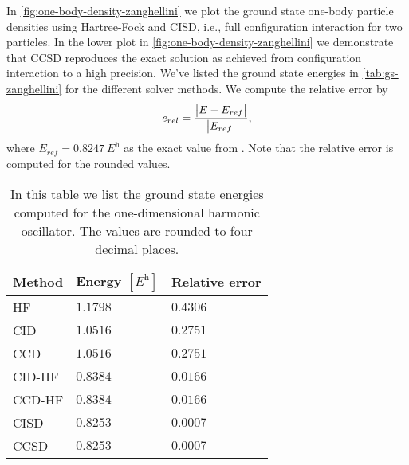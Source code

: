         In \autoref{fig:one-body-density-zanghellini} we plot the ground
        state one-body particle densities using Hartree-Fock and CISD, i.e.,
        full configuration interaction for two particles.
        In the lower plot in \autoref{fig:one-body-density-zanghellini} we
        demonstrate that CCSD reproduces the exact solution as achieved from
        configuration interaction to a high precision.
        We've listed the ground state energies in \autoref{tab:gs-zanghellini}
        for the different solver methods.
        We compute the relative error by
        \begin{align}
            e_{rel} = \frac{\abs{E - E_{ref}}}{\abs{E_{ref}}},
        \end{align}
        where $E_{ref} = \SI{0.8247}{\hartree}$ as the exact value from
        \citeauthor{zanghellini_2004} \cite{zanghellini_2004}.
        Note that the relative error is computed for the rounded values.

        \begin{table}
            \centering
            \caption{In this table we list the ground state energies computed
            for the one-dimensional harmonic oscillator.
            The values are rounded to four decimal places.}
            \renewcommand{\arraystretch}{1.3}
            \begin{tabular}{@{}lll@{}}
                \toprule
                Method & Energy $[\si{\hartree}]$
                & Relative error \\
                \midrule
                HF     & $1.1798$ & $0.4306$ \\
                CID    & $1.0516$ & $0.2751$ \\
                CCD    & $1.0516$ & $0.2751$ \\
                CID-HF & $0.8384$ & $0.0166$ \\
                CCD-HF & $0.8384$ & $0.0166$ \\
                CISD   & $0.8253$ & $0.0007$ \\
                CCSD   & $0.8253$ & $0.0007$ \\
                \bottomrule
            \end{tabular}
            \label{tab:gs-zanghellini}
        \end{table}

